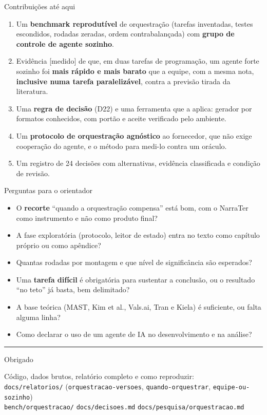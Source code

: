 \documentclass[11pt,aspectratio=169]{beamer}
\newcommand{\ev}[2]{{\scriptsize\sffamily\colorbox{#1!12}{\textcolor{#1!80!black}{[#2]}}}}
\newcommand{\medido}{\ev{ok}{medido}}
\begin{document}
\begin{frame}{Contribuições até aqui}
\begin{enumerate}\setlength\itemsep{0.5em}
\item Um \textbf{benchmark reprodutível} de orquestração (tarefas inventadas, testes escondidos, rodadas zeradas, ordem
  contrabalançada) com \textbf{grupo de controle de agente sozinho}.
\item Evidência \medido{} de que, em duas tarefas de programação, um agente forte sozinho foi
  \textbf{mais rápido e mais barato} que a equipe, com a mesma nota, \textbf{inclusive numa tarefa paralelizável},
  contra a previsão tirada da literatura.
\item Uma \textbf{regra de decisão} (D22) e uma ferramenta que a aplica: gerador por formatos conhecidos, com portão e
  aceite verificado pelo ambiente.
\item Um \textbf{protocolo de orquestração agnóstico} ao fornecedor, que não exige cooperação do agente, e o método para
  medi-lo contra um oráculo.
\item Um registro de 24 decisões com alternativas, evidência classificada e condição de revisão.
\end{enumerate}
\end{frame}

\begin{frame}{Perguntas para o orientador}
\begin{itemize}\setlength\itemsep{0.7em}
\item O \textbf{recorte} ``quando a orquestração compensa'' está bom, com o NarraTer como instrumento e não como
  produto final?
\item A fase exploratória (protocolo, leitor de estado) entra no texto como capítulo próprio ou como apêndice?
\item Quantas rodadas por montagem e que nível de significância são esperados?
\item Uma \textbf{tarefa difícil} é obrigatória para sustentar a conclusão, ou o resultado ``no teto'' já basta,
  bem delimitado?
\item A base teórica (MAST, Kim et al., Vals.ai, Tran e Kiela) é suficiente, ou falta alguma linha?
\item Como declarar o uso de um agente de IA no desenvolvimento e na análise?
\end{itemize}
\end{frame}

\begin{frame}[plain]
\vfill
\centering
{\color{acento}\rule{3em}{3pt}}\par\vspace{0.8em}
{Obrigado}\par
\vspace{1em}
{\small\color{suave} Código, dados brutos, relatório completo e como reproduzir:\\
\texttt{docs/relatorios/} (\texttt{orquestracao-versoes}, \texttt{quando-orquestrar}, \texttt{equipe-ou-sozinho})\\ \texttt{bench/orquestracao/} \quad \texttt{docs/decisoes.md} \quad \texttt{docs/pesquisa/orquestracao.md}}
\vfill
\end{frame}
\end{document}
